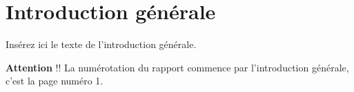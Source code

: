 \chapter*{Introduction générale}
\lhead{}

Insérez ici le texte de l'introduction générale.

\textbf{Attention} !! La numérotation du rapport commence par l’introduction générale, c’est la page
numéro 1.

